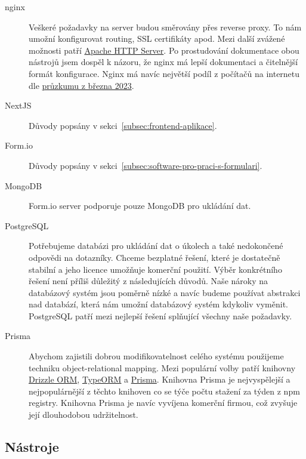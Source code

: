 \begin{description}
    \item[nginx]
    Veškeré požadavky na server budou směrovány přes reverse proxy.
    To nám umožní konfigurovat routing, SSL certifikáty apod.
    Mezi další zvážené možnosti patří \href{https://httpd.apache.org/}{Apache HTTP Server}.
    Po prostudování dokumentace obou nástrojů jsem dospěl k názoru, že nginx má lepší dokumentaci a čitelnější formát konfigurace.
    Nginx má navíc největší podíl z počítačů na internetu dle \href{https://news.netcraft.com/archives/category/web-server-survey/}{průzkumu z března 2023}.
    \item[NextJS]
    Důvody popsány v sekci~\ref{subsec:frontend-aplikace}.
    \item[Form.io]
    Důvody popsány v sekci~\ref{subsec:software-pro-praci-s-formulari}.
    \item[MongoDB]
    Form.io server podporuje pouze MongoDB pro ukládání dat\@.
    \item[PostgreSQL]
    Potřebujeme databázi pro ukládání dat o úkolech a také nedokončené odpovědi na dotazníky.
    Chceme bezplatné řešení, které je dostatečně stabilní a jeho licence umožňuje komerční použití.
    Výběr konkrétního řešení není příliš důležitý z následujících důvodů.
    Naše nároky na databázový systém jsou poměrně nízké a navíc budeme používat abstrakci nad databází, která nám umožní databázový systém kdykoliv vyměnit.
    PostgreSQL patří mezi nejlepší řešení splňující všechny naše požadavky.
    \item[Prisma]
    Abychom zajistili dobrou modifikovatelnost celého systému použijeme techniku object-relational mapping.
    Mezi populární volby patří knihovny \href{https://github.com/drizzle-team/drizzle-orm}{Drizzle ORM}, \href{https://github.com/typeorm/typeorm}{TypeORM} a \href{https://github.com/prisma/prisma}{Prisma}.
    Knihovna Prisma je nejvyspělejší a nejpopulárnější z těchto knihoven co se týče počtu stažení za týden z npm registry.
    Knihovna Prisma je navíc vyvíjena komerční firmou, což zvyšuje její dlouhodobou udržitelnost.
\end{description}

\subsection{Nástroje}\label{subsec:nastroje}

